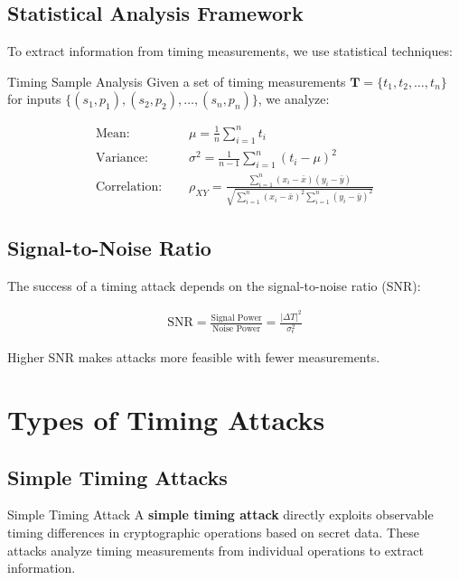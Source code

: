 \documentclass[12pt,a4paper]{article}
\theoremstyle{definition}
\newcommand{\timesamples}{\mathbf{T}}
\begin{document}
\subsection{Statistical Analysis Framework}

To extract information from timing measurements, we use statistical techniques:

\begin{definitionbox}{Timing Sample Analysis}
Given a set of timing measurements $\timesamples = \{t_1, t_2, \ldots, t_n\}$ for inputs $\{(s_1,p_1), (s_2,p_2), \ldots, (s_n,p_n)\}$, we analyze:

\begin{align}
\text{Mean: } \quad &\mu = \frac{1}{n}\sum_{i=1}^{n} t_i\\
\text{Variance: } \quad &\sigma^2 = \frac{1}{n-1}\sum_{i=1}^{n} (t_i - \mu)^2\\
\text{Correlation: } \quad &\rho_{XY} = \frac{\sum_{i=1}^{n}(x_i - \bar{x})(y_i - \bar{y})}{\sqrt{\sum_{i=1}^{n}(x_i - \bar{x})^2 \sum_{i=1}^{n}(y_i - \bar{y})^2}}
\end{align}
\end{definitionbox}

\subsection{Signal-to-Noise Ratio}

The success of a timing attack depends on the signal-to-noise ratio (SNR):

\begin{align}
\text{SNR} = \frac{\text{Signal Power}}{\text{Noise Power}} = \frac{|\Delta T|^2}{\sigma_{\epsilon}^2}
\end{align}

Higher SNR makes attacks more feasible with fewer measurements.

\section{Types of Timing Attacks}

\subsection{Simple Timing Attacks}

\begin{definitionbox}{Simple Timing Attack}
A \textbf{simple timing attack} directly exploits observable timing differences in cryptographic operations based on secret data. These attacks analyze timing measurements from individual operations to extract information.
\end{definitionbox}
\end{document}

